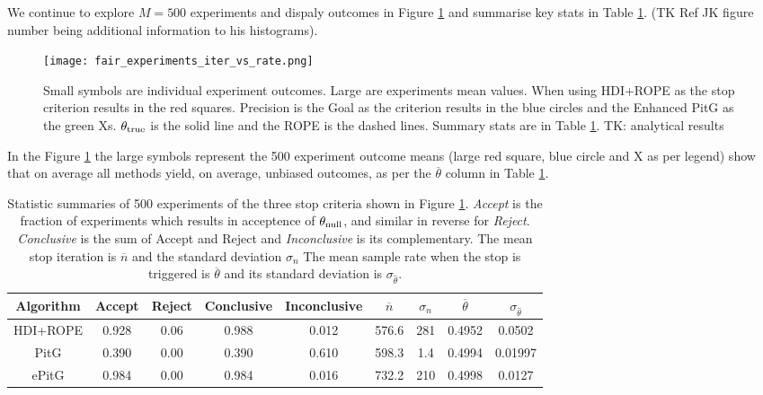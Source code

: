 We continue to explore $M=500$ experiments and dispaly outcomes in
Figure \ref{fig:fair_iter_vs_rate} and summarise key stats in
Table \ref{tab:fair_iter_vs_rate}. 
(TK Ref JK figure number being additional information to his histograms).


\begin{figure}[h!]
  \centering
  \texttt{[image: fair\_experiments\_iter\_vs\_rate.png]}
  \caption{Small symbols are individual experiment outcomes. Large are experiments
  mean values. When using HDI+ROPE as the stop criterion results in the red squares.
  Precision is the Goal as the criterion results in the blue circles
  and the Enhanced PitG as the green Xs. $\theta_{\rm true}$ is the solid line and
  the ROPE is the dashed lines. Summary stats are in Table \ref{tab:fair_iter_vs_rate}. TK: analytical results
  }
  \label{fig:fair_iter_vs_rate}
\end{figure}

In the Figure \ref{fig:fair_iter_vs_rate} the large symbols represent the 500 experiment outcome means 
(large red square, blue circle and X as per legend) show
that on average all methods yield, on average, unbiased outcomes, as per the
$\overline{\theta}$ column in Table \ref{tab:fair_iter_vs_rate}.


\begin{table}[h!]\label{tab:fair_iter_vs_rate}
  \begin{center}
  \begin{tabular}{c|c|c|c|c|c|c|c|c}
    \hline
    Algorithm & Accept & Reject & Conclusive & Inconclusive & $\overline{n}$ & $\sigma_n$ & $\overline{\theta}$ & $\sigma_{\hat{\theta}}$\\
    \hline
    HDI+ROPE & 0.928 & 0.06 & 0.988 & 0.012 & 576.6 & 281 & 0.4952 & 0.0502 \\
    PitG & 0.390 & 0.00 & 0.390 & 0.610 & 598.3 & 1.4 & 0.4994 & 0.01997 \\
    ePitG & 0.984 & 0.00 & 0.984 & 0.016 & 732.2 & 210 & 0.4998 & 0.0127\\
    \hline
  \end{tabular}
  \caption{Statistic summaries of 500 experiments of the three stop criteria shown in
  Figure \ref{fig:fair_iter_vs_rate}. {\it Accept}
  is the fraction of experiments which results in acceptence of $\theta_{\rm null}$,
  and similar in reverse for {\it Reject}. {\it Conclusive} is the sum of Accept
  and Reject and {\it Inconclusive} is its complementary.
  The mean stop iteration is $\overline{n}$ and the standard deviation $\sigma_n$
  The mean sample rate when the stop is triggered is $\overline{\theta}$ and its standard deviation is $\sigma_{\hat{\theta}}$.
  }
\end{center}
\end{table}

